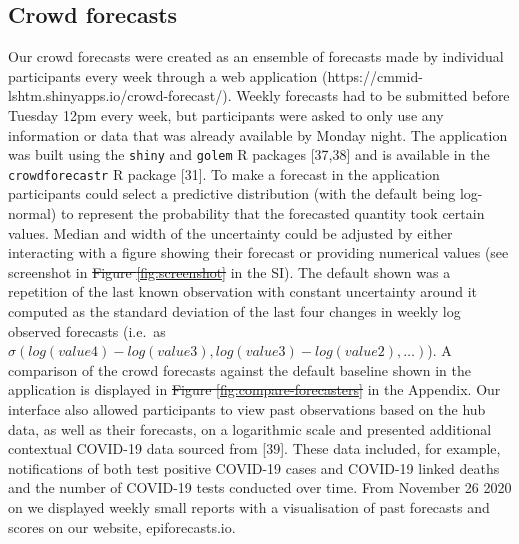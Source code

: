 \documentclass[10pt,letterpaper]{article}
\providecommand{\DIFdeltex}[1]{{\protect\color{red}\sout{#1}}}                      %
\providecommand{\DIFaddbegin}{} %
\providecommand{\DIFaddend}{} %
\providecommand{\DIFdelbegin}{} %
\providecommand{\DIFdelend}{} %
\providecommand{\DIFdel}[1]{\texorpdfstring{\DIFdeltex{#1}}{}} %
\newcommand{\DIFscaledelfig}{0.5}
\newlength{\DIFdelgraphicswidth} %
\newlength{\DIFdelgraphicsheight} %
\newcommand{\DIFaddincludegraphics}[2][]{{\color{blue}\fbox{\DIFOincludegraphics[#1]{#2}}}} %
\newcommand{\DIFdelincludegraphics}[2][]{%
\sbox{\DIFdelgraphicsbox}{\DIFOincludegraphics[#1]{#2}}%
\settoboxwidth{\DIFdelgraphicswidth}{\DIFdelgraphicsbox} %
\settoboxtotalheight{\DIFdelgraphicsheight}{\DIFdelgraphicsbox} %
\scalebox{\DIFscaledelfig}{%
\parbox[b]{\DIFdelgraphicswidth}{\usebox{\DIFdelgraphicsbox}\\[-\baselineskip] \rule{\DIFdelgraphicswidth}{0em}}\llap{\resizebox{\DIFdelgraphicswidth}{\DIFdelgraphicsheight}{%
\setlength{\unitlength}{\DIFdelgraphicswidth}%
\begin{picture}(1,1)%
\thicklines\linethickness{2pt} %
{\color[rgb]{1,0,0}\put(0,0){\framebox(1,1){}}}%
{\color[rgb]{1,0,0}\put(0,0){\line( 1,1){1}}}%
{\color[rgb]{1,0,0}\put(0,1){\line(1,-1){1}}}%
\end{picture}%
}\hspace*{3pt}}} %
} %
\DeclareRobustCommand{\DIFaddbegin}{\DIFOaddbegin \let\includegraphics\DIFaddincludegraphics} %
\DeclareRobustCommand{\DIFaddend}{\DIFOaddend \let\includegraphics\DIFOincludegraphics} %
\DeclareRobustCommand{\DIFdelbegin}{\DIFOdelbegin \let\includegraphics\DIFdelincludegraphics} %
\DeclareRobustCommand{\DIFdelend}{\DIFOaddend \let\includegraphics\DIFOincludegraphics} %
\begin{document}
\hypertarget{crowd-forecasts}{%
\subsection{Crowd forecasts}\label{crowd-forecasts}}

Our crowd forecasts were created as an ensemble of forecasts made by
individual participants every week through a web application
(https://cmmid-lshtm.shinyapps.io/crowd-forecast/). Weekly forecasts had
to be submitted before Tuesday 12pm every week, but participants were
asked to only use any information or data that was already available by
Monday night. The application was built using the \texttt{shiny} and
\texttt{golem} R packages {[}37,38{]} and is available in the
\texttt{crowdforecastr} R package {[}31{]}. To make a forecast in the
application participants could select a predictive distribution (with
the default being log-normal) to represent the probability that the
forecasted quantity took certain values. Median and width of the
uncertainty could be adjusted by either interacting with a figure
showing their forecast or providing numerical values (see screenshot in
\DIFdelbegin \DIFdel{Figure \ref{fig:screenshot} }\DIFdelend \DIFaddbegin {} \DIFaddend in the SI). The default shown was a repetition
of the last known observation with constant uncertainty around it
computed as the standard deviation of the last four changes in weekly
log observed forecasts (i.e.~as
\(\sigma(log(value4) - log(value3), log(value3) - log(value2), \ldots )\)).
A comparison of the crowd forecasts against the default baseline shown
in the application is displayed in \DIFdelbegin \DIFdel{Figure \ref{fig:compare-forecasters}
}\DIFdelend \DIFaddbegin {} \DIFaddend in
the Appendix. Our interface also allowed participants to view past
observations based on the hub data, as well as their forecasts, on a
logarithmic scale and presented additional contextual COVID-19 data
sourced from {[}39{]}. These data included, for example, notifications
of both test positive COVID-19 cases and COVID-19 linked deaths and the
number of COVID-19 tests conducted over time. From November 26 2020 on
we displayed weekly small reports with a visualisation of past forecasts
and scores on our website, epiforecasts.io.
\end{document}
